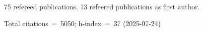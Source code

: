 75 refereed publications. 13 refeered publications as first author.

Total citations~=~5050; h-index~=~37 (2025-07-24)